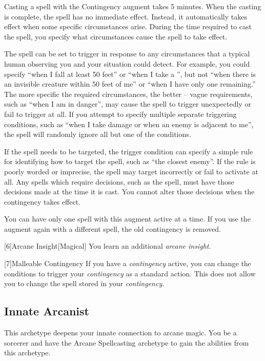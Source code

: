         Casting a spell with the Contingency augment takes 5 minutes.
        When the casting is complete, the spell has no immediate effect.
        Instead, it automatically takes effect when some specific circumstances arise.
        During the time required to cast the spell, you specify what circumstances cause the spell to take effect.

        The spell can be set to trigger in response to any circumstances that a typical human observing you and your situation could detect.
        For example, you could specify ``when I fall at least 50 feet'' or ``when I take a '', but not ``when there is an invisible creature within 50 feet of me'' or ``when I have only one  remaining.''
        The more specific the required circumstances, the better -- vague requirements, such as ``when I am in danger'', may cause the spell to trigger unexpectedly or fail to trigger at all.
        If you attempt to specify multiple separate triggering conditions, such as ``when I take damage or when an enemy is adjacent to me'', the spell will randomly ignore all but one of the conditions.

        If the spell needs to be targeted, the trigger condition can specify a simple rule for identifying how to target the spell, such as ``the closest enemy''.
        If the rule is poorly worded or imprecise, the spell may target incorrectly or fail to activate at all.
        Any spells which require decisions, such as the  spell, must have those decisions made at the time it is cast.
        You cannot alter those decisions when the contingency takes effect.

        You can have only one spell with this augment active at a time.
        If you use the augment again with a different spell, the old contingency is removed.

        [6]{Arcane Insight}[Magical]
        You learn an additional \textit{arcane insight}.

        [7]{Malleable Contingency} If you have a \textit{contingency} active, you can change the conditions to trigger your \textit{contingency} as a standard action.
        This does not allow you to change the spell stored in your \textit{contingency}.

    \subsection{Innate Arcanist}
        This archetype deepens your innate connection to arcane magic.
        You be a sorcerer and have the Arcane Spellcasting archetype to gain the abilities from this archetype.

